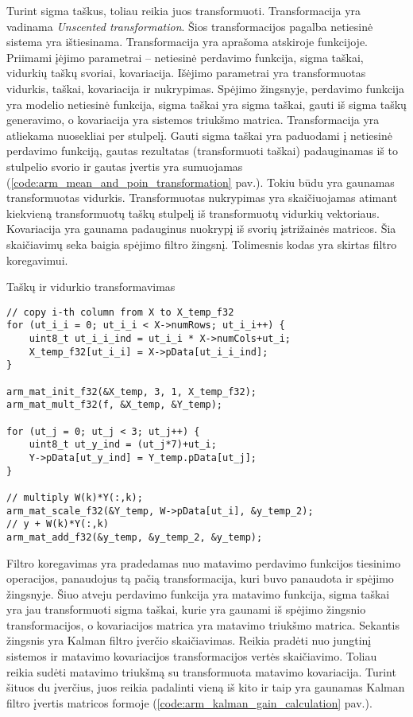 Turint sigma taškus, toliau reikia juos transformuoti.
Transformacija \cite{julier2002scaled} yra vadinama \textit{Unscented transformation}.
Šios transformacijos pagalba netiesinė sistema yra ištiesinama.
Transformacija yra aprašoma atskiroje funkcijoje.
Priimami įėjimo parametrai -- netiesinė perdavimo funkcija, sigma taškai, vidurkių taškų svoriai, kovariacija.
Išėjimo parametrai yra transformuotas vidurkis, taškai, kovariacija ir nukrypimas.
Spėjimo žingsnyje, perdavimo funkcija yra modelio netiesinė funkcija, sigma taškai yra sigma taškai, gauti iš sigma taškų generavimo, o kovariacija yra sistemos triukšmo matrica.
Transformacija yra atliekama nuosekliai per stulpelį.
Gauti sigma taškai yra paduodami į netiesinė perdavimo funkciją, gautas rezultatas (transformuoti taškai) padauginamas iš to stulpelio svorio ir gautas įvertis yra sumuojamas (\ref{code:arm_mean_and_poin_transformation} pav.).
Tokiu būdu yra gaunamas transformuotas vidurkis.
Transformuotas nukrypimas yra skaičiuojamas atimant kiekvieną transformuotų taškų stulpelį iš transformuotų vidurkių vektoriaus.
Kovariacija yra gaunama padauginus nuokrypį iš svorių įstrižainės matricos. Šia skaičiavimų seka baigia spėjimo filtro žingsnį.
Tolimesnis kodas yra skirtas filtro koregavimui.

\begin{cfigure}
    \centering
    \caption{Taškų ir vidurkio transformavimas}
    \label{code:arm_mean_and_poin_transformation}
    \begin{lstlisting}
// copy i-th column from X to X_temp_f32
for (ut_i_i = 0; ut_i_i < X->numRows; ut_i_i++) {
    uint8_t ut_i_i_ind = ut_i_i * X->numCols+ut_i;
    X_temp_f32[ut_i_i] = X->pData[ut_i_i_ind];
}

arm_mat_init_f32(&X_temp, 3, 1, X_temp_f32);
arm_mat_mult_f32(f, &X_temp, &Y_temp);

for (ut_j = 0; ut_j < 3; ut_j++) {
    uint8_t ut_y_ind = (ut_j*7)+ut_i;
    Y->pData[ut_y_ind] = Y_temp.pData[ut_j];
}

// multiply W(k)*Y(:,k);
arm_mat_scale_f32(&Y_temp, W->pData[ut_i], &y_temp_2);
// y + W(k)*Y(:,k)
arm_mat_add_f32(&y_temp, &y_temp_2, &y_temp);
    \end{lstlisting}
\end{cfigure}

Filtro koregavimas yra pradedamas nuo matavimo perdavimo funkcijos tiesinimo operacijos, panaudojus tą pačią transformacija, kuri buvo panaudota ir spėjimo žingsnyje.
Šiuo atveju perdavimo funkcija yra matavimo funkcija, sigma taškai yra jau transformuoti sigma taškai, kurie yra gaunami iš spėjimo žingsnio transformacijos, o kovariacijos matrica yra matavimo triukšmo matrica.
Sekantis žingsnis yra Kalman filtro įverčio skaičiavimas.
Reikia pradėti nuo jungtinį sistemos ir matavimo kovariacijos transformacijos vertės skaičiavimo.
Toliau reikia sudėti matavimo triukšmą su transformuota matavimo kovariacija.
Turint šituos du įverčius, juos reikia padalinti vieną iš kito ir taip yra gaunamas Kalman filtro įvertis matricos formoje (\ref{code:arm_kalman_gain_calculation} pav.).

